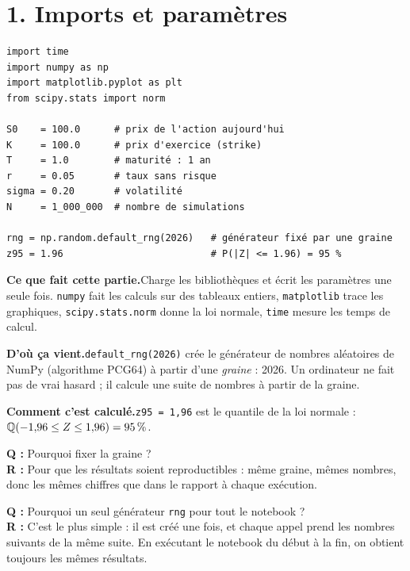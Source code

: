 \documentclass[11pt,a4paper]{article}
\newcommand{\quoi}[1]{\par\noindent\textbf{\color{bleu}Ce que fait cette partie.}\enspace #1\par}
\newcommand{\source}[1]{\par\noindent\textbf{\color{orange}D'où ça vient.}\enspace #1\par}
\newcommand{\calcul}[1]{\par\noindent\textbf{\color{bleu}Comment c'est calculé.}\enspace #1\par}
\newcommand{\prof}[2]{\begin{tcolorbox}[colback=orange!6,colframe=orange!80,boxrule=0.4pt,arc=2pt,left=5pt,right=5pt,top=2pt,bottom=2pt]\small\textbf{Q :} #1\\[1pt]\textbf{R :} #2\end{tcolorbox}}
\newcommand{\sect}[1]{\clearpage\section{#1}}
\begin{document}
\sect{1. Imports et paramètres}
\begin{lstlisting}
import time
import numpy as np
import matplotlib.pyplot as plt
from scipy.stats import norm

S0    = 100.0      # prix de l'action aujourd'hui
K     = 100.0      # prix d'exercice (strike)
T     = 1.0        # maturité : 1 an
r     = 0.05       # taux sans risque
sigma = 0.20       # volatilité
N     = 1_000_000  # nombre de simulations

rng = np.random.default_rng(2026)   # générateur fixé par une graine
z95 = 1.96                          # P(|Z| <= 1.96) = 95 %
\end{lstlisting}
\quoi{Charge les bibliothèques et écrit les paramètres une seule fois. \texttt{numpy} fait les calculs sur des tableaux entiers, \texttt{matplotlib} trace les graphiques, \texttt{scipy.stats.norm} donne la loi normale, \texttt{time} mesure les temps de calcul.}
\source{\texttt{default\_rng(2026)} crée le générateur de nombres aléatoires de NumPy (algorithme PCG64) à partir d'une \emph{graine} : 2026. Un ordinateur ne fait pas de vrai hasard ; il calcule une suite de nombres à partir de la graine.}
\calcul{\texttt{z95 = 1,96} est le quantile de la loi normale : $\mathbb{Q}(-1{,}96\le Z\le1{,}96) = 95\,\%$.}
\prof{Pourquoi fixer la graine ?}{Pour que les résultats soient reproductibles : même graine, mêmes nombres, donc les mêmes chiffres que dans le rapport à chaque exécution.}
\prof{Pourquoi un seul générateur \texttt{rng} pour tout le notebook ?}{C'est le plus simple : il est créé une fois, et chaque appel prend les nombres suivants de la même suite. En exécutant le notebook du début à la fin, on obtient toujours les mêmes résultats.}
\end{document}
